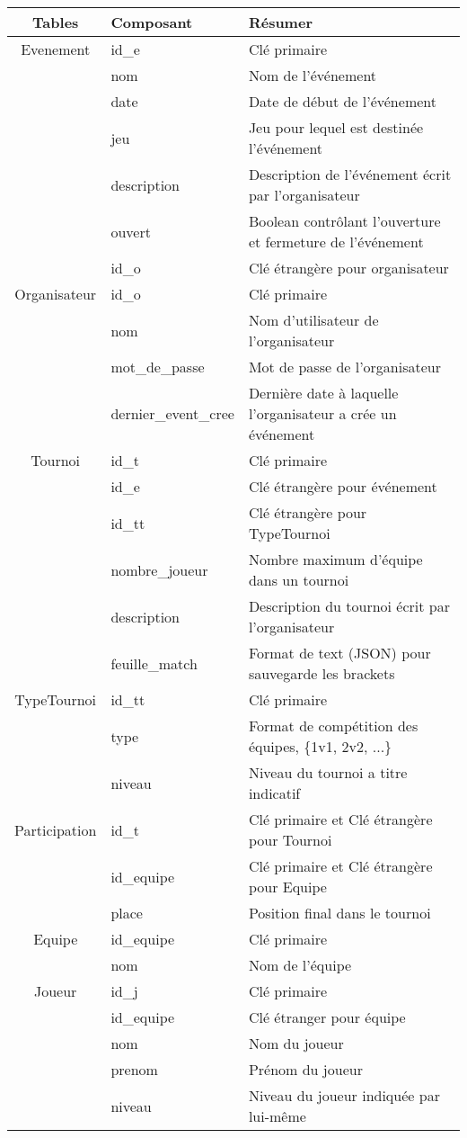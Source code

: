\documentclass{article}
\begin{document}
\noindent
\begin{tabular}{|c|l|l|}
\hline
Tables & Composant & Résumer\\
\hline
Evenement & id\_e & Clé primaire\\
& nom & Nom de l’événement\\
& date & Date de début de l’événement\\
& jeu & Jeu pour lequel est destinée l’événement\\
& description & Description de l’événement écrit par l'organisateur\\
& ouvert & Boolean contrôlant l'ouverture et fermeture de l’événement\\
& id\_o & Clé étrangère pour organisateur\\
\hline
Organisateur & id\_o & Clé primaire\\
& nom & Nom d'utilisateur de l'organisateur\\
& mot\_de\_passe &  Mot de passe de l'organisateur\\
& dernier\_event\_cree & Dernière date à laquelle l'organisateur a crée un événement\\
\hline
Tournoi & id\_t & Clé primaire\\
& id\_e & Clé étrangère pour événement\\
& id\_tt & Clé étrangère pour TypeTournoi\\
& nombre\_joueur & Nombre maximum d'équipe dans un tournoi\\
& description & Description du tournoi écrit par l'organisateur\\
& feuille\_match & Format de text (JSON) pour sauvegarde les brackets\\
\hline
TypeTournoi & id\_tt & Clé primaire\\
& type & Format de compétition des équipes, \{1v1, 2v2, ...\}\\
& niveau & Niveau du tournoi a titre indicatif\\
\hline
Participation & id\_t & Clé primaire et Clé étrangère pour Tournoi\\
& id\_equipe & Clé primaire et Clé étrangère pour Equipe\\
& place & Position final dans le tournoi\\
\hline
Equipe & id\_equipe & Clé primaire\\
& nom & Nom de l'équipe\\
\hline
Joueur & id\_j & Clé primaire\\
& id\_equipe & Clé étranger pour équipe\\
& nom & Nom du joueur\\
& prenom & Prénom du joueur\\
& niveau & Niveau du joueur indiquée par lui-même\\
\hline
\end{tabular}
\\
\newpage
\end{document}
